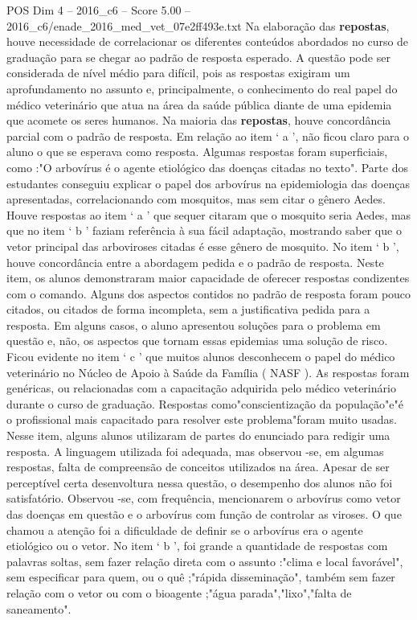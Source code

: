 \begin{textsample}{POS Dim 4 – 2016\_c6 – Score 5.00 – 2016\_c6/enade\_2016\_med\_vet\_07e2ff493e.txt}
Na elaboração das \textbf{repostas}, houve necessidade de correlacionar os diferentes conteúdos abordados no curso de graduação para se chegar ao padrão de resposta esperado.
A questão pode ser considerada de nível médio para difícil, pois as respostas exigiram um aprofundamento no assunto e, principalmente, o conhecimento do real papel do médico veterinário que atua na área da saúde pública diante de uma epidemia que acomete os seres humanos.
Na maioria das \textbf{repostas}, houve concordância parcial com o padrão de resposta.
Em relação ao item ‘ a ’, não ficou claro para o aluno o que se esperava como resposta.
Algumas respostas foram superficiais, como :"O arbovírus é o agente etiológico das doenças citadas no texto".
Parte dos estudantes conseguiu explicar o papel dos arbovírus na epidemiologia das doenças apresentadas, correlacionando com mosquitos, mas sem citar o gênero Aedes.
Houve respostas ao item ‘ a ’ que sequer citaram que o mosquito seria Aedes, mas que no item ‘ b ’ faziam referência à sua fácil adaptação, mostrando saber que o vetor principal das arboviroses citadas é esse gênero de mosquito.
No item ‘ b ’, houve concordância entre a abordagem pedida e o padrão de resposta.
Neste item, os alunos demonstraram maior capacidade de oferecer respostas condizentes com o comando.
Alguns dos aspectos contidos no padrão de resposta foram pouco citados, ou citados de forma incompleta, sem a justificativa pedida para a resposta.
Em alguns casos, o aluno apresentou soluções para o problema em questão e, não, os aspectos que tornam essas epidemias uma solução de risco.
Ficou evidente no item ‘ c ’ que muitos alunos desconhecem o papel do médico veterinário no Núcleo de Apoio à Saúde da Família ( NASF ).
As respostas foram genéricas, ou relacionadas com a capacitação adquirida pelo médico veterinário durante o curso de graduação.
Respostas como"conscientização da população"e"é o profissional mais capacitado para resolver este problema"foram muito usadas.
Nesse item, alguns alunos utilizaram de partes do enunciado para redigir uma resposta.
A linguagem utilizada foi adequada, mas observou -se, em algumas respostas, falta de compreensão de conceitos utilizados na área.
Apesar de ser perceptível certa desenvoltura nessa questão, o desempenho dos alunos não foi satisfatório.
Observou -se, com frequência, mencionarem o arbovírus como vetor das doenças em questão e o arbovírus com função de controlar as viroses.
O que chamou a atenção foi a dificuldade de definir se o arbovírus era o agente etiológico ou o vetor.
No item ‘ b ’, foi grande a quantidade de respostas com palavras soltas, sem fazer relação direta com o assunto :"clima e local favorável", sem especificar para quem, ou o quê ;"rápida disseminação", também sem fazer relação com o vetor ou com o bioagente ;"água parada","lixo","falta de saneamento".

\end{textsample}
